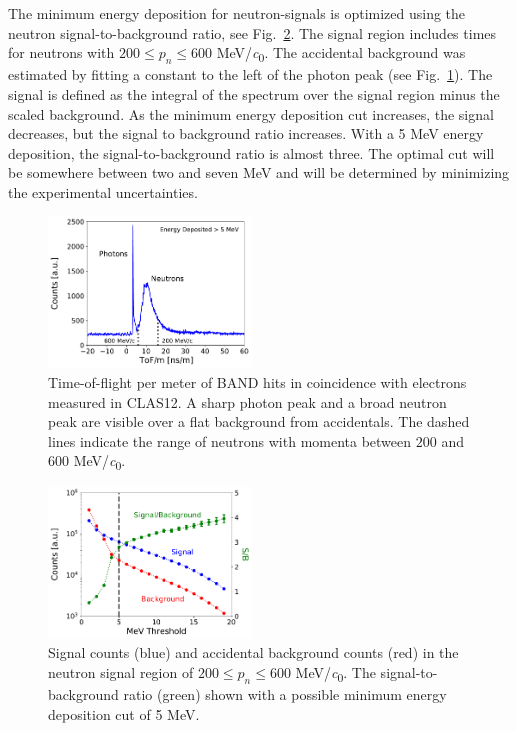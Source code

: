 \documentclass[3p,final,twocolumn]{elsarticle}
\begin{document}
The minimum energy deposition for neutron-signals is optimized using the neutron
signal-to-background ratio, see Fig.~\ref{fig:signalbackground}. The
signal region includes times for neutrons with $200\le p_n \le600$
\si{\MeV/\clight}. The accidental background was estimated by
fitting a constant to the left of the photon peak (see
Fig.~\ref{fig:tof}). The signal is defined as the integral of the
spectrum over the signal region minus the scaled background.  
As the minimum energy deposition cut increases, the signal decreases,
but the signal to background ratio increases.  
With a 5 \si{\MeV} energy deposition,
the signal-to-background ratio is almost three. The optimal cut will
be somewhere between two and seven \si{\MeV} and will be determined by
minimizing the experimental uncertainties.
\begin{figure}[tb]
	\centering
		\includegraphics[width=0.48\textwidth]{tofm-performance.pdf}
                \caption{Time-of-flight per meter of BAND hits in
                  coincidence with electrons measured in
                  CLAS12. A sharp photon peak and a broad neutron peak are visible
                  over a flat background from accidentals. The dashed
                  lines indicate the range of neutrons with momenta
                  between $200$ and $600$ \si{\MeV/\clight}.}
	\label{fig:tof}
\end{figure}

\begin{figure}[tb]
	\centering
		\includegraphics[width=0.48\textwidth]{signalbackgroundratio.pdf}
	\caption{Signal counts (blue) and accidental background counts
          (red) in the neutron signal region of $200 \le p_n \le 600$ \si{\MeV/\clight}. The signal-to-background ratio (green) shown with a possible minimum energy deposition cut of 5 \si{\MeV}.}
	\label{fig:signalbackground}
\end{figure}
\end{document}
